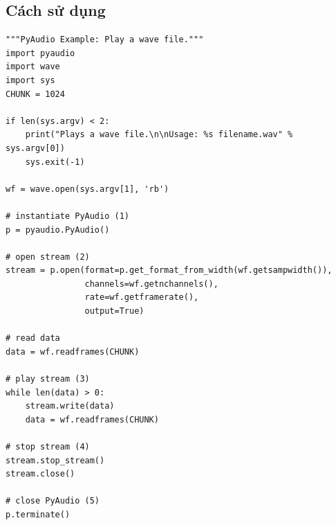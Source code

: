 \subsection{Cách sử dụng}
\begin{lstlisting}
"""PyAudio Example: Play a wave file."""
import pyaudio
import wave
import sys
CHUNK = 1024

if len(sys.argv) < 2:
	print("Plays a wave file.\n\nUsage: %s filename.wav" % sys.argv[0])
	sys.exit(-1)

wf = wave.open(sys.argv[1], 'rb')

# instantiate PyAudio (1)
p = pyaudio.PyAudio()

# open stream (2)
stream = p.open(format=p.get_format_from_width(wf.getsampwidth()),
                channels=wf.getnchannels(),
                rate=wf.getframerate(),
                output=True)

# read data
data = wf.readframes(CHUNK)

# play stream (3)
while len(data) > 0:
	stream.write(data)
	data = wf.readframes(CHUNK)

# stop stream (4)
stream.stop_stream()
stream.close()

# close PyAudio (5)
p.terminate()
\end{lstlisting}


